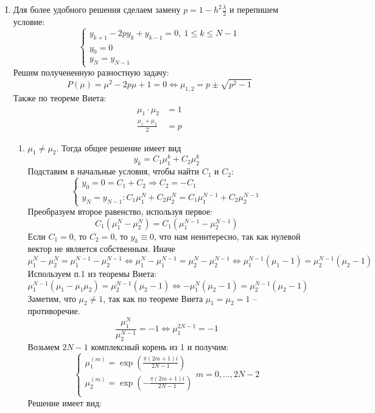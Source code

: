 \documentclass[12pt]{article}
\begin{document}
\begin{enumerate}[I.]
    \item Для более удобного решения сделаем замену $p=1-h^2\frac{\lambda}{2}$ и перепишем условие:
    \[\begin{cases}
        y_{k+1}-2py_k+y_{k-1} = 0,\ 1 \leq k \leq N-1 \\
        y_0 = 0 \\
        y_N = y_{N-1}
    \end{cases}\]
    Решим получененную разностную задачу:
    \[P(\mu) = \mu^2-2p\mu+1 = 0 \Leftrightarrow \mu_{1,2}=p \pm \sqrt{p^2-1}\]
    Также по теореме Виета:
    \begin{align}
        \mu_1\cdot \mu_2&=1 \\
        \frac{\mu_1+\mu_2}{2} &= p
    \end{align}
    \begin{enumerate}
        \item $\mu_1\neq\mu_2$. Тогда общее решение имеет вид
        \[y_k=C_1\mu_1^k+C_2\mu_2^k\]
        Подставим в начальные условия, чтобы найти $C_1$ и $C_2$:
        \[\begin{cases}
            y_0 = 0 = C_1+C_2\Rightarrow C_2=-C_1 \\
            y_N=y_{N-1}: C_1\mu_1^N+C_2\mu_2^N = C_1\mu_1^{N-1}+C_2\mu_2^{N-1}
        \end{cases}\]
        Преобразуем второе равенство, используя первое:
        \[C_1(\mu_1^N-\mu_2^N)=C_1(\mu_1^{N-1}-\mu_2^{N-1})\]
        Если $C_1 = 0$, то $C_2=0$, то $y_k\equiv 0$, что нам неинтересно, так как нулевой вектор не является собственным. Иначе
        \[\mu_1^N-\mu_2^N=\mu_1^{N-1}-\mu_2^{N-1} \Leftrightarrow
        \mu_1^N-\mu_1^{N-1}=\mu_2^N-\mu_2^{N-1} \Leftrightarrow
        \mu_1^{N-1}(\mu_1-1)=\mu_2^{N-1}(\mu_2-1)\]
        Используем п.1 из теоремы Виета:
        \[\mu_1^{N-1}(\mu_1-\mu_1\mu_2)=\mu_2^{N-1}(\mu_2-1)\Leftrightarrow-\mu_1^N(\mu_2-1)=\mu_2^{N-1}(\mu_2-1)\]
        Заметим, что $\mu_2\neq 1$, так как по теореме Виета $\mu_1=\mu_2=1$ -- противоречие.
        \[\frac{\mu_1^N}{\mu_2^{N-1}}=-1\Leftrightarrow\mu_1^{2N-1}=-1\]
        Возьмем $2N-1$ комплексный корень из 1 и получим:
        \[\begin{cases}
            \mu_1^{(m)} = \exp(\frac{\pi(2m+1)i}{2N-1}) \\
            \mu_2^{(m)} = \exp(-\frac{\pi(2m+1)i}{2N-1}) \\
        \end{cases} m = 0, ...,2N-2\]
        Решение имеет вид:
        \begin{multline*}

\end{multline*}
\end{enumerate}
\end{enumerate}
\end{document}
